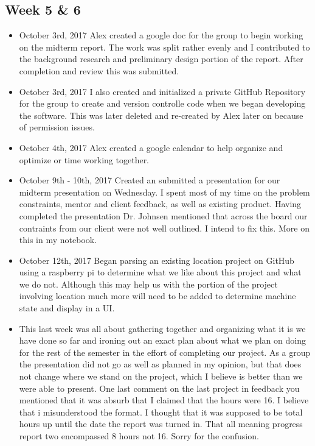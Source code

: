 \documentclass[12pt]{article}
\begin{document}
	\subsection{Week 5 \& 6}
		\begin{itemize}
			\item October 3rd, 2017 Alex created a google doc for the group to begin working on the midterm report.  The work was split rather evenly and I contributed to the background research and preliminary design portion of the report.  After completion and review this was submitted.
			\item October 3rd, 2017 I also created and initialized a private GitHub Repository for the group to create and version controlle code when we began developing the software. This was later deleted and re-created by Alex later on because of permission issues.
			\item October 4th, 2017 Alex created a google calendar to help organize and optimize or time working together.
			\item October 9th - 10th, 2017 Created an submitted a presentation for our midterm presentation on Wednesday.  I spent most of my time on the problem constraints, mentor and client feedback, as well as existing product.  Having completed the presentation Dr. Johnsen mentioned that across the board our contraints from our client were not well outlined.  I intend to fix this.  More on this in my notebook.
			\item October 12th, 2017 Began parsing an existing location project on GitHub using a raspberry pi to determine what we like about this project and what we do not.  Although this may help us with the portion of the project involving location much more will need to be added to determine machine state and display in a UI.
			\item This last week was all about gathering together and organizing what it is we have done so far and ironing out an exact plan about what we plan on doing for the rest of the semester in the effort of completing our project.  As a group the presentation did not go as well as planned in my opinion, but that does not change where we stand on the project, which I believe is better than we were able to present.  One last comment on the last project in feedback you mentioned that it was absurb that I claimed that the hours were 16.  I believe that i misunderstood the format.  I thought that it was supposed to be total hours up until the date the report was turned in.  That all meaning progress report two encompassed 8 hours not 16.  Sorry for the confusion.
		\end{itemize}
		
\end{document}
